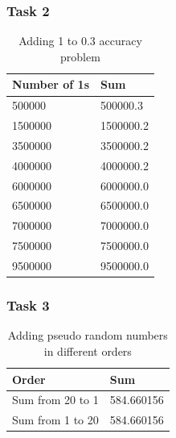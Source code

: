 \documentclass[12pt]{article}
\begin{document}
  \subsubsection*{Task 2}
  \begin{table}[H]
    \centering
    \begin{tabular}{|l|l|}
      \hline
      Number of 1s & Sum       \\ \hline
      500000       & 500000.3  \\ \hline
      1500000      & 1500000.2 \\ \hline
      3500000      & 3500000.2 \\ \hline
      4000000      & 4000000.2 \\ \hline
      6000000      & 6000000.0 \\ \hline
      6500000      & 6500000.0 \\ \hline
      7000000      & 7000000.0 \\ \hline
      7500000      & 7500000.0 \\ \hline
      9500000      & 9500000.0 \\ \hline
    \end{tabular}
    \caption{Adding 1 to 0.3 accuracy problem}
    \label{fig:lab2_task2}
  \end{table}

  \subsubsection*{Task 3}
  \begin{table}[H]
    \centering
    \begin{tabular}{|l|l|}
      \hline
      Order            & Sum        \\ \hline
      Sum from 20 to 1 & 584.660156 \\ \hline
      Sum from 1 to 20 & 584.660156 \\ \hline
    \end{tabular}
    \caption{Adding pseudo random numbers in different orders}
    \label{fig:lab2_task3}
  \end{table}
\end{document}
